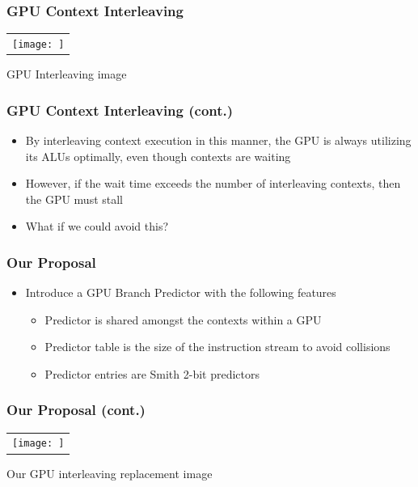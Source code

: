 \documentclass{beamer}
\begin{document}
\begin{frame}
	\frametitle{GPU Context Interleaving}
	\begin{tabular}{c}
		\texttt{[image: ]}
	\end{tabular}
	GPU Interleaving image
\end{frame}

\begin{frame}
	\frametitle{GPU Context Interleaving (cont.)}
	\begin{itemize}
		\item By interleaving context execution in this manner, the GPU is always utilizing its ALUs optimally, even though contexts are waiting
		\item However, if the wait time exceeds the number of interleaving contexts, then the GPU must stall
		\item What if we could avoid this?
	\end{itemize}
\end{frame}

\begin{frame}
	\frametitle{Our Proposal}
	\begin{itemize}
		\item Introduce a GPU Branch Predictor with the following features
		\begin{itemize}
			\item Predictor is shared amongst the contexts within a GPU
			\item Predictor table is the size of the instruction stream to avoid collisions
			\item Predictor entries are Smith 2-bit predictors
		\end{itemize}
	\end{itemize}
\end{frame}

\begin{frame}
	\frametitle{Our Proposal (cont.)}
	\begin{tabular}{c}
		\texttt{[image: ]}
	\end{tabular}
	Our GPU interleaving replacement image
\end{frame}
\end{document}
